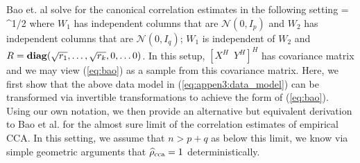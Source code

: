 Bao et. al \cite{bao2014canonical} solve for the canonical correlation estimates in the following
setting
\beq\label{eq:bao}
\left[\begin{array}{c}X \\ Y\end{array}\right] = \left[\begin{array}{cc}I_p & R \\ R^H & I_q\end{array}\right]^{1/2}\left[\begin{array}{c}W_1 \\ W_2\end{array}\right]
\eeq
where $W_1$ has independent columns that are $\mathcal{N}(0,I_p)$ and $W_2$ has
independent columns that are $\mathcal{N}(0,I_q)$; $W_1$ is independent of $W_2$ and $R =
\mathop{\bf diag}(\sqrt{r_1},\dots,\sqrt{r_k},0,\dots 0)$. In this setup, $[X^H\,\,\, Y^H]^H$ has covariance
matrix 
\be
\left[\begin{array}{cc}I_p & R \\ R^H & I_q\end{array}\right]
\ee
and we may view (\ref{eq:bao}) as a sample from this covariance matrix. Here, we first show
that the above data model in (\ref{eq:appen3:data_model}) can be transformed via
invertible transformations to achieve the 
form of (\ref{eq:bao}). Using our own notation, we then provide an alternative but
equivalent derivation to Bao et al. for the almost sure limit of the correlation estimates of
empirical CCA. In this setting, we assume that $n>p+q$ as below this limit, we know via simple
geometric arguments that $\widehat{\rho}_\text{cca}=1$ deterministically.

